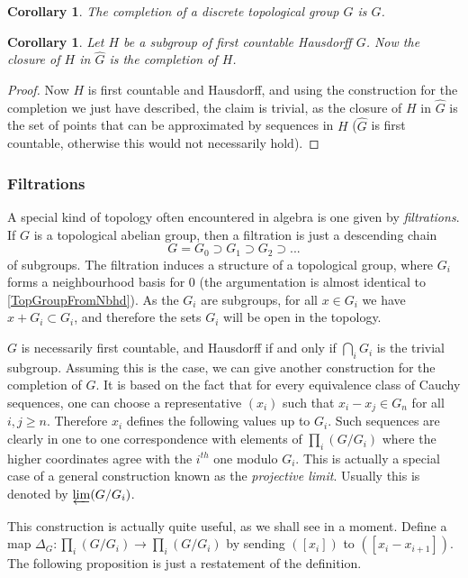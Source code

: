 \documentclass[12pt,a4paper,leqno]{article}
\newcommand{\fref}[1]{\hyperref[{#1}]{\ref*{#1}}}
\theoremstyle{plain}
\newtheorem{cor}[theo]{Corollary}
\theoremstyle{definition}
\theoremstyle{remark}
\begin{document}
\begin{cor}
The completion of a discrete topological group $G$ is $G$.
\end{cor} 

\begin{cor}
Let $H$ be a subgroup of first countable Hausdorff $G$. Now the closure of $H$ in $\widehat G$ is the completion of $H$.
\end{cor}
\begin{proof}
Now $H$ is first countable and Hausdorff, and using the construction for the completion we just have described, the claim is trivial, as the closure of $H$ in $\widehat G$ is the set of points that can be approximated by sequences in $H$ ($\widehat G$ is first countable, otherwise this would not necessarily hold).
\end{proof}

\subsubsection*{Filtrations}

A special kind of topology often encountered in algebra is one given by \emph{filtrations}. If $G$ is a topological abelian group, then a filtration is just a descending chain 
\begin{equation*}
G = G_0 \supset G_1 \supset G_2 \supset ...
\end{equation*}
of subgroups. The filtration induces a structure of a topological group, where $G_i$ forms a neighbourhood basis for $0$ (the argumentation is almost identical to \fref{TopGroupFromNbhd}). As the $G_i$ are subgroups, for all $x \in G_i$ we have $x + G_i \subset G_i$, and therefore the sets $G_i$ will be open in the topology.

$G$ is necessarily first countable, and Hausdorff if and only if $\bigcap_i G_i$ is the trivial subgroup. Assuming this is the case, we can give another construction for the completion of $G$. It is based on the fact that for every equivalence class of Cauchy sequences, one can choose a representative $(x_i)$ such that $x_i - x_j \in G_n$ for all $i,j \geq n$. Therefore $x_i$ defines the following values up to $G_i$. Such sequences are clearly in one to one correspondence with elements of $\prod_i (G/G_i)$ where the higher coordinates agree with the $i^{th}$ one modulo $G_i$. This is actually a special case of a general construction known as the \emph{projective limit}. Usually this is denoted by $\varprojlim (G/G_i)$.

This construction is actually quite useful, as we shall see in a moment. Define a map $\Delta_G : \prod_i (G/G_i) \to \prod_i (G/G_i)$ by sending $([x_i])$ to $([x_i - x_{i+1}])$. The following proposition is just a restatement of the definition.
\end{document}
